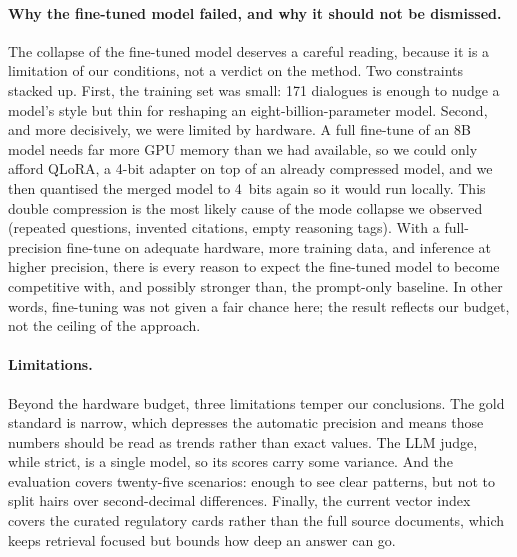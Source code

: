 \documentclass[11pt]{article}
\begin{document}
\paragraph{Why the fine-tuned model failed, and why it should not be dismissed.}
The collapse of the fine-tuned model deserves a careful reading, because it is a
limitation of our conditions, not a verdict on the method. Two constraints stacked
up. First, the training set was small: 171 dialogues is enough to nudge a model's style
but thin for reshaping an eight-billion-parameter model. Second, and more decisively, we
were limited by hardware. A full fine-tune of an 8B model needs far more GPU memory than
we had available, so we could only afford QLoRA, a 4-bit adapter on top of an already
compressed model, and we then quantised the merged model to 4~bits again so it would
run locally. This double compression is the most likely cause of the mode collapse we
observed (repeated questions, invented citations, empty reasoning tags). With a
full-precision fine-tune on adequate hardware, more training data, and inference at higher
precision, there is every reason to expect the fine-tuned model to become competitive with,
and possibly stronger than, the prompt-only baseline. In other words, fine-tuning
was not given a fair chance here; the result reflects our budget, not the ceiling of the
approach.
\paragraph{Limitations.}
Beyond the hardware budget, three limitations temper our conclusions. The gold standard is
narrow, which depresses the automatic precision and means those numbers should be read as
trends rather than exact values. The LLM judge, while strict, is a single model, so its
scores carry some variance. And the evaluation covers twenty-five scenarios: enough to see
clear patterns, but not to split hairs over second-decimal differences. Finally, the
current vector index covers the curated regulatory cards rather than the full source
documents, which keeps retrieval focused but bounds how deep an answer can go.
\end{document}
